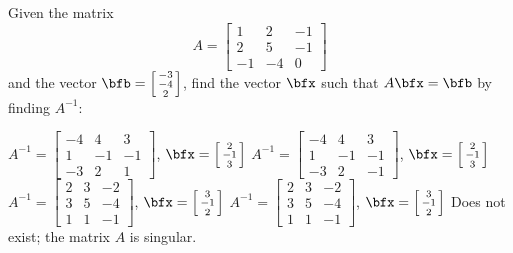 \begin{questions}
  \question[10] Given the matrix
  \[
    A=
    \begin{bmatrix}
      1&2&-1\\
      2&5&-1\\
      -1&-4&0
    \end{bmatrix}
  \]
  and the vector
  $\bfb=\left[\begin{smallmatrix}-3\\-4\\2\end{smallmatrix}\right]$,
  find the vector $\bfx$ such that $A\bfx=\bfb$ by finding $A^{-1}$:
    \begin{choices}
    \choice $ A^{-1} =\left[
      \begin{smallmatrix}
        -4&4&3\\
        1&-1&-1\\
        -3&2&1
      \end{smallmatrix}\right]$,
    $\bfx=\left[
      \begin{smallmatrix}
        2\\
        -1\\
        3
      \end{smallmatrix}
    \right]$%
    \choice $A^{-1}=\left[
      \begin{smallmatrix}
        -4&4&3\\
        1&-1&-1\\
        -3&2&-1
      \end{smallmatrix}\right]$,
    $\bfx= \left[
      \begin{smallmatrix}
        2\\
        -1\\
        3
      \end{smallmatrix}
    \right]$%
    \choice $ A^{-1} =\left[
      \begin{smallmatrix}
        2&3&-2\\
        3&5&-4\\
        1&1&-1
      \end{smallmatrix}\right]$,
    $\bfx= \left[
      \begin{smallmatrix}
        3\\
        -1\\
        2
      \end{smallmatrix}
    \right]$%
    \choice $A^{-1} =\left[
      \begin{smallmatrix}
        2&3&-2\\
        3&5&-4\\
        1&1&-1
      \end{smallmatrix}
    \right]$, $\bfx=\left[
      \begin{smallmatrix}
        3\\
        -1\\
        2
      \end{smallmatrix}\right]$%
    \choice Does not exist; the matrix $A$ is singular.
  \end{choices}
  \begin{solution}
  \end{solution}
\end{questions}

